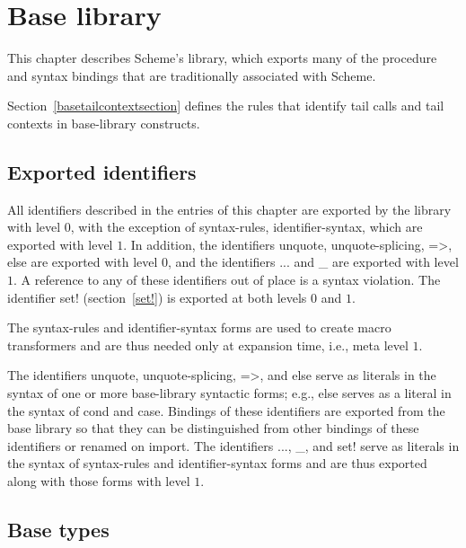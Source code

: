 \chapter{Base library}
\label{baselibrarychapter}

This chapter describes Scheme's  library, which exports many of
the procedure and syntax bindings that are traditionally associated
with Scheme.

Section~\ref{basetailcontextsection} defines the rules that identify
tail calls and tail contexts in base-library constructs.

\section{Exported identifiers}

All identifiers described in the entries of this chapter are exported
by the  library with level $0$, with the exception
of {\cf syntax-rules}, {\cf
  identifier-syntax}, which are exported with
level $1$.
In addition, the identifiers {\cf unquote}, {\cf
  unquote-splicing}, {\cf =>}\schindex{=>},
{\cf else} are exported with level $0$, and the
identifiers {\cf ...} and {\cf \_}\schindex{\_} are
exported with level $1$.
A reference to any of these identifiers out of place is a syntax
violation.
The identifier {\cf set!} (section~\ref{set!})
is exported at both levels $0$ and $1$.

\begin{rationale}
The {\cf syntax-rules} and {\cf identifier-syntax} forms are
used to create macro transformers and are thus needed only at
expansion time, i.e., meta level $1$.  

The identifiers {\cf unquote}, {\cf unquote-splicing}, {\cf =>}, and
{\cf else} serve as literals in the syntax of one or more
base-library syntactic forms; e.g., {\cf else} serves as a
literal in the syntax of {\cf cond} and {\cf case}.
Bindings of these identifiers are exported from the base library so
that they can be distinguished from other bindings of these identifiers
or renamed on import.
The identifiers {\cf ...}, {\cf \_}, and {\cf set!} serve as
literals in the syntax of {\cf syntax-rules} and
{\cf identifier-syntax} forms and are thus exported along with those
forms with level $1$.
\end{rationale}

\section{Base types}
\label{disjointness}

